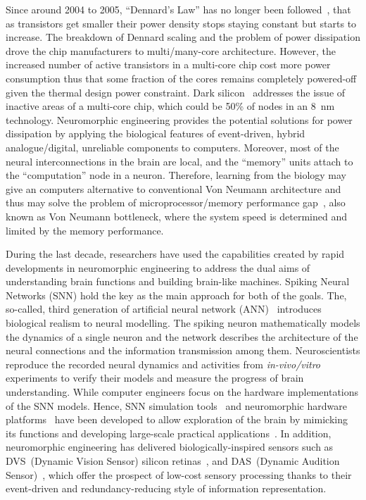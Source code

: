 Since around 2004 to 2005, ``Dennard's Law'' has no longer been followed~\cite{bohr200730}, that as transistors get smaller their power density stops staying constant but starts to increase.
The breakdown of Dennard scaling and the problem of power dissipation drove the chip manufacturers to multi/many-core architecture.
However, the increased number of active transistors in a multi-core chip cost more power consumption thus that some fraction of the cores remains completely powered-off given the thermal design power constraint.
Dark silicon~\cite{esmaeilzadeh2011dark} addresses the issue of inactive areas of a multi-core chip, which could be 50\% of nodes in an 8~nm technology.
Neuromorphic engineering provides the potential solutions for power dissipation by applying the biological features of event-driven, hybrid analogue/digital, unreliable components to computers.
Moreover, most of the neural interconnections in the brain are local, and the ``memory'' units attach to the ``computation'' node in a neuron.
Therefore, learning from the biology may give an computers alternative to conventional Von Neumann architecture and thus may solve the problem of microprocessor/memory performance gap~\cite{wulf1995hitting}, also known as Von Neumann bottleneck, where the system speed is determined and limited by the memory performance.



During the last decade, researchers have used the capabilities created by rapid developments in neuromorphic engineering to address the dual aims of understanding brain functions and building brain-like machines.
Spiking Neural Networks (SNN) hold the key as the main approach for both of the goals.
The, so-called, third generation of artificial neural network (ANN)~\cite{maass1997networks} introduces biological realism to neural modelling.
The spiking neuron mathematically models the dynamics of a single neuron and the network describes the architecture of the neural connections and the information transmission among them.
Neuroscientists reproduce the recorded neural dynamics and activities from \textit{in-vivo/vitro} experiments to verify their models and measure the progress of brain understanding.
While computer engineers focus on the hardware implementations of the SNN models.
Hence, SNN simulation tools~\cite{davison2008pynn, gewaltig2007nest, goodman2008brian} and neuromorphic hardware platforms~\cite{furber2014spinnaker,  schemmel2010wafer,benjamin2014neurogrid,merolla2014million} have been developed to allow exploration of the brain by mimicking its functions and developing large-scale practical applications~\cite{eliasmith2012large}.
In addition, neuromorphic engineering has delivered biologically-inspired sensors such as DVS~(Dynamic Vision Sensor) silicon retinas~\cite{serrano2013128, delbruck2008frame, yang2015dynamic, posch2014retinomorphic}, and DAS~(Dynamic Audition Sensor)~\cite{5537164}, which offer the prospect of low-cost sensory processing thanks to their event-driven and redundancy-reducing style of information representation.

